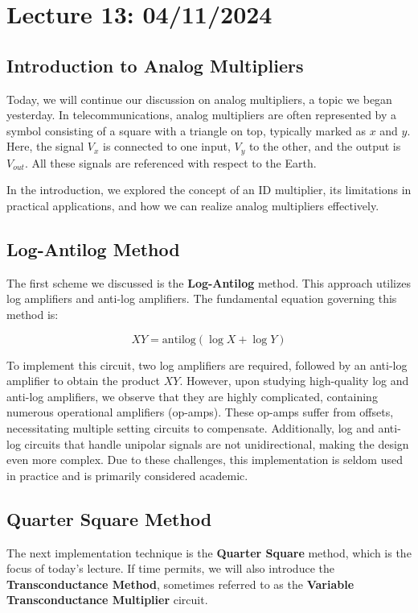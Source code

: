 
\section{Lecture 13: 04/11/2024}

\subsection{Introduction to Analog Multipliers}

Today, we will continue our discussion on analog multipliers, a topic we began yesterday. In telecommunications, analog multipliers are often represented by a symbol consisting of a square with a triangle on top, typically marked as \( x \) and \( y \). Here, the signal \( V_x \) is connected to one input, \( V_y \) to the other, and the output is \( V_{out} \). All these signals are referenced with respect to the Earth.

In the introduction, we explored the concept of an ID multiplier, its limitations in practical applications, and how we can realize analog multipliers effectively.

\subsection{Log-Antilog Method}

The first scheme we discussed is the \textbf{Log-Antilog} method. This approach utilizes log amplifiers and anti-log amplifiers. The fundamental equation governing this method is:

\[
XY = \text{antilog}(\log X + \log Y)
\]

To implement this circuit, two log amplifiers are required, followed by an anti-log amplifier to obtain the product \( XY \). However, upon studying high-quality log and anti-log amplifiers, we observe that they are highly complicated, containing numerous operational amplifiers (op-amps). These op-amps suffer from offsets, necessitating multiple setting circuits to compensate. Additionally, log and anti-log circuits that handle unipolar signals are not unidirectional, making the design even more complex. Due to these challenges, this implementation is seldom used in practice and is primarily considered academic.

\subsection{Quarter Square Method}

The next implementation technique is the \textbf{Quarter Square} method, which is the focus of today's lecture. If time permits, we will also introduce the \textbf{Transconductance Method}, sometimes referred to as the \textbf{Variable Transconductance Multiplier} circuit.


